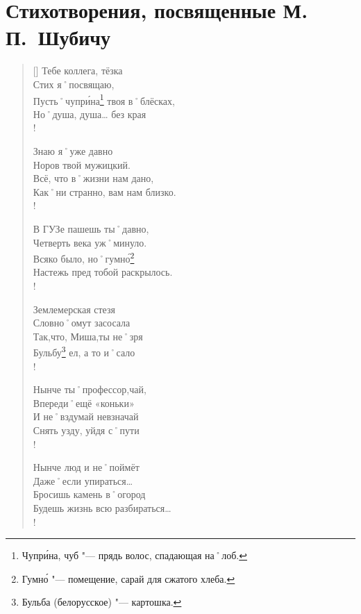 ﻿\section{Стихотворения, посвященные М.\,П.~Шубичу}

\begin{verse}[\versewidth]
Тебе коллега, тёзка           \\
Стих я˚посвящаю,               \\
Пусть˚чупр\'{и}на\footnote{Чупр\'{и}на, чуб "--- прядь волос, спадающая на˚лоб.} твоя в˚блёсках, \\
Но˚душа, душа… без края \\!

\vin Знаю я˚уже давно               \\						%
\vin Норов твой мужицкий.            \\
\vin Всё, что в˚жизни нам дано,      \\
\vin Как˚ни странно, вам нам близко. \\!

В ГУЗе пашешь ты˚давно,         \\
Четверть века уж˚минуло.        \\
Всяко было, но˚гумн\'{о}\footnote{Гумн\'{о} "--- помещение, сарай для сжатого хлеба.}           \\
Настежь пред тобой раскрылось. \\!

\vin Землемерская стезя             \\
\vin Словно˚омут засосала           \\
\vin Так,что, Миша,ты не˚зря        \\
\vin Бульбу\footnote{Бульба (белорусское) "--- картошка.} ел, а то и˚сало \\!

Нынче ты˚профессор,чай,        \\
Впереди˚ещё «коньки»             \\
И не˚вздумай невзначай         \\
Снять узду, уйдя с˚пути  				\\!

\vin Нынче люд и не˚поймёт          \\
\vin Даже˚если упираться…         \\
\vin Бросишь камень в˚огород        \\
\vin Будешь жизнь всю разбираться… \\!


\end{verse}
